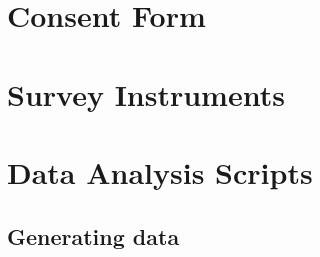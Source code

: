 \documentclass[11pt, a4paper]{article}\usepackage[]{graphicx}\usepackage[]{color}
\begin{document}
\newpage

\printbibliography

\newpage

\appendix

\section{Consent Form}
\section{Survey Instruments}
\section{Data Analysis Scripts} \label{sec:rscripts}

    \subsection{Generating data}
\end{document}
